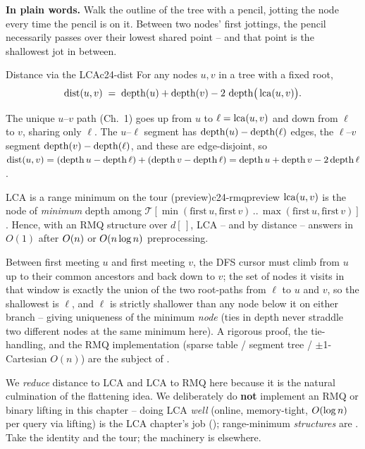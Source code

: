 \noindent\textbf{In plain words.} Walk the outline of the tree with a pencil, jotting the
node every time the pencil is on it. Between two nodes' first jottings, the pencil necessarily
passes over their lowest shared point -- and that point is the shallowest jot in between.

\begin{theorem}{Distance via the LCA}{c24-dist}
For any nodes $u, v$ in a tree with a fixed root,
\[
   \operatorname{dist}(u, v) \;=\; \operatorname{depth}(u) + \operatorname{depth}(v) - 2\,\operatorname{depth}\!\big(\operatorname{lca}(u,v)\big).
\]
\end{theorem}
\begin{proofbox}
The unique $u$--$v$ path (Ch.~1) goes up from $u$ to $\ell = \operatorname{lca}(u,v)$ and down from $\ell$
to $v$, sharing only $\ell$. The $u$--$\ell$ segment has $\operatorname{depth}(u)-\operatorname{depth}(\ell)$ edges, the
$\ell$--$v$ segment $\operatorname{depth}(v)-\operatorname{depth}(\ell)$, and these are edge-disjoint, so
$\operatorname{dist}(u,v) = (\operatorname{depth} u - \operatorname{depth} \ell) + (\operatorname{depth} v - \operatorname{depth} \ell) = \operatorname{depth} u + \operatorname{depth} v -
2\operatorname{depth}\ell$.
\end{proofbox}

\begin{proposition}{LCA is a range minimum on the tour (preview)}{c24-rmqpreview}
$\operatorname{lca}(u,v)$ is the node of \emph{minimum} depth among
$\mathcal{T}[\min(\mathrm{first}\,u, \mathrm{first}\,v) \,..\, \max(\mathrm{first}\,u, \mathrm{first}\,v)]$.
Hence, with an RMQ structure over $d[\,]$, LCA -- and by  distance -- answers
in $O(1)$ after $O(n)$ or $O(n\log n)$ preprocessing.
\end{proposition}
\begin{proofbox}
Between first meeting $u$ and first meeting $v$, the DFS cursor must climb from $u$ up to
their common ancestors and back down to $v$; the set of nodes it visits in that window is
exactly the union of the two root-paths from $\ell$ to $u$ and $v$, so the shallowest is
$\ell$, and $\ell$ is strictly shallower than any node below it on either branch -- giving
uniqueness of the minimum \emph{node} (ties in depth never straddle two different nodes at the
same minimum here). A rigorous proof, the tie-handling, and the RMQ implementation (sparse
table / segment tree / $\pm$1-Cartesian $O(n)$) are the subject of .
\end{proofbox}
\begin{notebox}
We \emph{reduce} distance to LCA and LCA to RMQ here because it is the natural culmination of
the flattening idea. We deliberately do \textbf{not} implement an RMQ or binary lifting in
this chapter -- doing LCA \emph{well} (online, memory-tight, $O(\log n)$ per query via
lifting) is the LCA chapter's job (); range-minimum \emph{structures} are
. Take the identity and the tour; the machinery is elsewhere.
\end{notebox}

